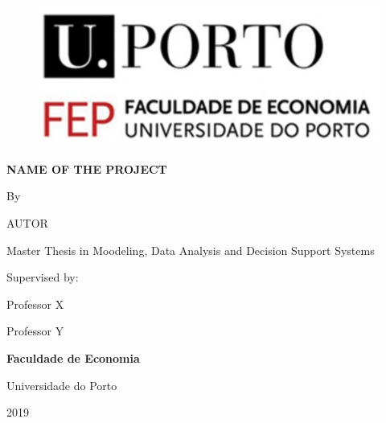 \date{}
\begin{titlepage}
\begin{center}

\begin{figure}[ht!]
    \centering
    \includegraphics[scale=0.5]{images/FEP.PNG}
\end{figure}

\vspace*{0.7in}
{\LARGE \textbf{ {\scshape NAME OF THE PROJECT}}}
\par
\vspace{0.4in}
{\large By}
\par
\vspace{0.4in}
{\large AUTOR}
\par
\vspace{1in}
{\large Master Thesis in Moodeling, Data Analysis \protect \linebreak and Decision Support Systems}
\par
\vspace{0.8in}
\end{center}
{\large Supervised by:} \\ 
\par
{\large Professor X}
\par
\vspace{0.10in}
{\large Professor Y}
\vspace{1in}
\begin{center}
{\large \textbf{Faculdade de Economia}}
\par
\vspace{0.10in}
{\large Universidade do Porto}
\par
\vspace{0.2in}
{\large 2019}
\end{center}
\end{titlepage}

